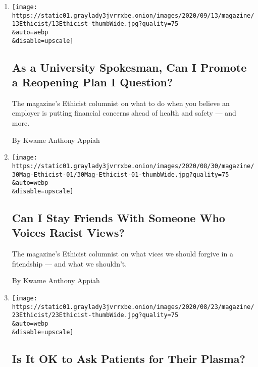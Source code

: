 \begin{enumerate}
\def\labelenumi{\arabic{enumi}.}
\item
  \href{/2020/09/08/magazine/university-reopening-safety-ethics.html}{}

  \texttt{[image: https://static01.graylady3jvrrxbe.onion/images/2020/09/13/magazine/13Ethicist/13Ethicist-thumbWide.jpg?quality=75\\\&auto=webp\\\&disable=upscale]}

  \hypertarget{as-a-university-spokesman-can-i-promote-a-reopening-plan-i-question}{%
  \subsection{As a University Spokesman, Can I Promote a Reopening Plan
  I
  Question?}\label{as-a-university-spokesman-can-i-promote-a-reopening-plan-i-question}}

  The magazine's Ethicist columnist on what to do when you believe an
  employer is putting financial concerns ahead of health and safety ---
  and more.

  By Kwame Anthony Appiah
\item
  \href{/2020/08/25/magazine/can-i-stay-friends-with-someone-who-voices-racist-views.html}{}

  \texttt{[image: https://static01.graylady3jvrrxbe.onion/images/2020/08/30/magazine/30Mag-Ethicist-01/30Mag-Ethicist-01-thumbWide.jpg?quality=75\\\&auto=webp\\\&disable=upscale]}

  \hypertarget{can-i-stay-friends-with-someone-who-voices-racist-views}{%
  \subsection{Can I Stay Friends With Someone Who Voices Racist
  Views?}\label{can-i-stay-friends-with-someone-who-voices-racist-views}}

  The magazine's Ethicist columnist on what vices we should forgive in a
  friendship --- and what we shouldn't.

  By Kwame Anthony Appiah
\item
  \href{/2020/08/18/magazine/is-it-ok-to-ask-patients-for-their-plasma.html}{}

  \texttt{[image: https://static01.graylady3jvrrxbe.onion/images/2020/08/23/magazine/23Ethicist/23Ethicist-thumbWide.jpg?quality=75\\\&auto=webp\\\&disable=upscale]}

  \hypertarget{is-it-ok-to-ask-patients-for-their-plasma}{%
  \subsection{Is It OK to Ask Patients for Their
  Plasma?}\label{is-it-ok-to-ask-patients-for-their-plasma}}


\end{enumerate}
